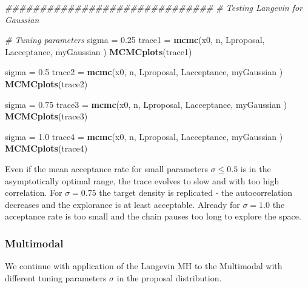 \documentclass[
]{article}
\newenvironment{Shaded}{\begin{snugshade}}{\end{snugshade}}
\newcommand{\CommentTok}[1]{\textcolor[rgb]{0.56,0.35,0.01}{\textit{#1}}}
\newcommand{\FloatTok}[1]{\textcolor[rgb]{0.00,0.00,0.81}{#1}}
\newcommand{\KeywordTok}[1]{\textcolor[rgb]{0.13,0.29,0.53}{\textbf{#1}}}
\newcommand{\NormalTok}[1]{#1}
\newcommand{\StringTok}[1]{\textcolor[rgb]{0.31,0.60,0.02}{#1}}
\begin{document}
\begin{Shaded}
\begin{Highlighting}[]
\CommentTok{##############################}
\CommentTok{# Testing Langevin for Gaussian}

\CommentTok{# Tuning parameters}
\NormalTok{sigma =}\StringTok{ }\FloatTok{0.25} 
\NormalTok{trace1 =}\StringTok{ }\KeywordTok{mcmc}\NormalTok{(x0, n, Lproposal, Lacceptance, myGaussian )}
\KeywordTok{MCMCplots}\NormalTok{(trace1)}

\NormalTok{sigma =}\StringTok{ }\FloatTok{0.5} 
\NormalTok{trace2 =}\StringTok{ }\KeywordTok{mcmc}\NormalTok{(x0, n, Lproposal, Lacceptance, myGaussian )}
\KeywordTok{MCMCplots}\NormalTok{(trace2)}

\NormalTok{sigma =}\StringTok{ }\FloatTok{0.75}
\NormalTok{trace3 =}\StringTok{ }\KeywordTok{mcmc}\NormalTok{(x0, n, Lproposal, Lacceptance, myGaussian )}
\KeywordTok{MCMCplots}\NormalTok{(trace3)}

\NormalTok{sigma =}\StringTok{ }\FloatTok{1.0}
\NormalTok{trace4 =}\StringTok{ }\KeywordTok{mcmc}\NormalTok{(x0, n, Lproposal, Lacceptance, myGaussian )}
\KeywordTok{MCMCplots}\NormalTok{(trace4)}
\end{Highlighting}
\end{Shaded}

Even if the mean acceptance rate for small parameters \(\sigma\leq 0.5\)
is in the asymptotically optimal range, the trace evolves to slow and
with too high correlation. For \(\sigma=0.75\) the target density is
replicated - the autocorrelation decreases and the explorance is at
least acceptable. Already for \(\sigma=1.0\) the acceptance rate is too
small and the chain pauses too long to explore the space.

\hypertarget{multimodal-1}{%
\subsubsection{Multimodal}\label{multimodal-1}}

We continue with application of the Langevin MH to the Multimodal with
different tuning parameters \(\sigma\) in the proposal distribution.
\end{document}
